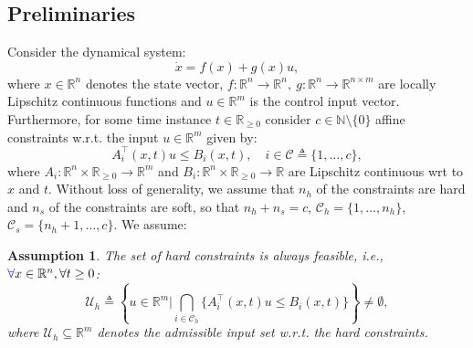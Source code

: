 \documentclass[letterpaper, 10 pt, conference]{ieeeconf}  %
\newtheorem{assum}{\textbf{Assumption}}
\begin{document}
\subsection{Preliminaries}
Consider the dynamical system:
\begin{equation}\label{eq:dynamics}
    \dot{x} = f(x) + g(x)u,
\end{equation}
where $x\in\mathbb{R}^n$ denotes the state vector, $f:\mathbb{R}^n\rightarrow\mathbb{R}^n,\ g:\mathbb{R}^n\rightarrow\mathbb{R}^{n\times m}$ are locally Lipschitz continuous functions and $u\in\mathbb{R}^m$ is the control input vector. Furthermore, for some time instance $t\in\mathbb{R}_{\geq0}$ consider {\color{blue}$c\in\mathbb{N}\setminus\{0\}$} affine constraints w.r.t. the input $u\in\mathbb{R}^m$ given by:
\begin{equation}\label{eq:affine_cnstr}
A_i^\top(x,t)u \leq B_i(x,t), \quad i\in \mathcal C\triangleq \lbrace 1,\dots,c\rbrace,
\end{equation}
where $A_i : \mathbb{R}^n \times \mathbb{R}_{\geq 0}\rightarrow \mathbb{R}^m$ and $B_i: \mathbb{R}^n \times \mathbb{R}_{\geq 0}\rightarrow\mathbb{R}$ are Lipschitz continuous wrt to $x$ and $t$. %
  Without loss of generality, we assume that $n_h$ of the constraints are hard and $n_s$ of the constraints are soft, so that $n_h+n_s=c$, $\mathcal{C}_h=\{1,\dots,n_h\}$, $\mathcal C_s=\{n_h+1,\dots,c\}$. We assume:
\begin{assum}
\label{assum:hard_const_compatible}
    The set of hard constraints is always feasible, i.e., ${\color{blue}\forall }x\in\mathbb{R}^n, \forall t\geq 0$: 
    \begin{equation}
    \mathcal{U}_h \triangleq \left\{ u\in\mathbb{R}^m | \bigcap_{i\in\mathcal{C}_h} \{A_i^\top(x,t)u\leq B_i(x,t)\} \right\}\neq \emptyset,
    \end{equation}
    where $\mathcal{U}_h \subseteq \mathbb{R}^m$ denotes the admissible input set w.r.t. the hard constraints. %
\end{assum}
\end{document}

